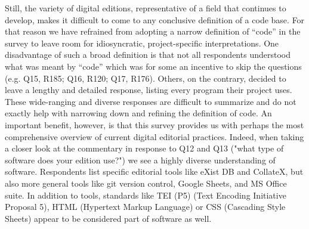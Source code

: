 \begin{paper}
Still, the variety of digital editions, representative of a field that
continues to develop, makes it difficult to come to any conclusive
definition of a code base. For that reason we have refrained from
adopting a narrow definition of ``code'' in the survey to leave room for
idiosyncratic, project-specific interpretations. One disadvantage of
such a broad definition is that not all respondents understood what was
meant by ``code'' which was for some an incentive to skip the questions
(e.g. Q15, R185; Q16, R120; Q17, R176). Others, on the contrary, decided
to leave a lengthy and detailed response, listing every program their
project uses. These wide-ranging and diverse responses are difficult to
summarize and do not exactly help with narrowing down and refining the
definition of code. An important benefit, however, is that this survey
provides us with perhaps the most comprehensive overview of current
digital editorial practices. Indeed, when taking a closer look at the
commentary in response to Q12 and Q13 ("what type of software does your edition
use?") we see a highly diverse understanding of software. Respondents
list specific editorial tools like eXist DB and CollateX, but also more
general tools like git version control, Google Sheets, and MS Office
suite. In addition to tools, standards like TEI (P5) (Text Encoding
Initiative Proposal 5), HTML (Hypertext Markup Language) or CSS
(Cascading Style Sheets) appear to be considered part of software as
well.


\end{paper}

